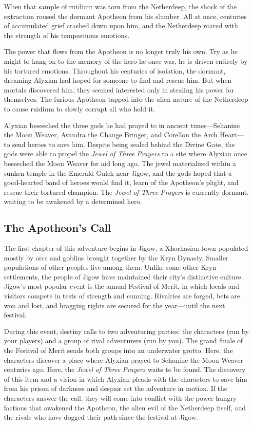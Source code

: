 \documentclass[letterpaper, 11pt, bg=full, twocolumn]{dndbook}
\begin{document}
When that sample of ruidium was torn from the Netherdeep, the shock of the extraction roused the dormant Apotheon from his slumber. All at once, centuries of accumulated grief crashed down upon him, and the Netherdeep roared with the strength of his tempestuous emotions.

The power that flows from the Apotheon is no longer truly his own. Try as he might to hang on to the memory of the hero he once was, he is driven entirely by his tortured emotions. Throughout his centuries of isolation, the dormant, dreaming Alyxian had hoped for someone to find and rescue him. But when mortals discovered him, they seemed interested only in stealing his power for themselves. The furious Apotheon tapped into the alien nature of the Netherdeep to cause ruidium to slowly corrupt all who hold it.

Alyxian beseeched the three gods he had prayed to in ancient times---Sehanine the Moon Weaver, Avandra the Change Bringer, and Corellon the Arch Heart---to send heroes to save him. Despite being sealed behind the Divine Gate, the gods were able to propel the \textit{Jewel of Three Prayers} to a site where Alyxian once beseeched the Moon Weaver for aid long ago. The jewel materialized within a sunken temple in the Emerald Gulch near Jigow, and the gods hoped that a good-hearted band of heroes would find it, learn of the Apotheon's plight, and rescue their tortured champion. The \textit{Jewel of Three Prayers} is currently dormant, waiting to be awakened by a determined hero.

\subsection{The Apotheon's Call}

The first chapter of this adventure begins in Jigow, a Xhorhasian town populated mostly by orcs and goblins brought together by the Kryn Dynasty. Smaller populations of other peoples live among them. Unlike some other Kryn settlements, the people of Jigow have maintained their city's distinctive culture. Jigow's most popular event is the annual Festival of Merit, in which locals and visitors compete in tests of strength and cunning. Rivalries are forged, bets are won and lost, and bragging rights are secured for the year---until the next festival.

During this event, destiny calls to two adventuring parties: the characters (run by your players) and a group of rival adventurers (run by you). The grand finale of the Festival of Merit sends both groups into an underwater grotto. Here, the characters discover a place where Alyxian prayed to Sehanine the Moon Weaver centuries ago. Here, the \textit{Jewel of Three Prayers} waits to be found. The discovery of this item and a vision in which Alyxian pleads with the characters to save him from his prison of darkness and despair set the adventure in motion. If the characters answer the call, they will come into conflict with the power-hungry factions that awakened the Apotheon, the alien evil of the Netherdeep itself, and the rivals who have dogged their path since the festival at Jigow.
\end{document}
